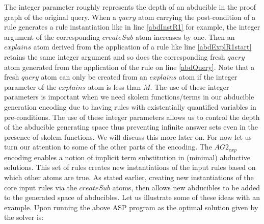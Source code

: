 The integer parameter roughly
represents the depth of an abducible in the proof graph of the original
query. When a $query$ atom carrying the post-condition of a rule generates a
rule instantiation like in line \ref{abdInstR1} for example, the integer argument of the
corresponding $createSub$ atom increases by one. Then an $explains$ atom
derived from the application of a rule like line \ref{abdExplR1start} retains the same integer
argument and so does the corresponding fresh $query$ atom generated from the
application of the rule on line \ref{abdQuery}. Note that a fresh $query$ atom can only be
created from an $explains$ atom if the integer parameter of the $explains$
atom is less than $M$. The use of these integer parameters is important
when we need skolem functions/terms in our abducible generation encoding due
to having rules with existentially quantified variables in pre-conditions. The
use of these integer parameters allows us to control the depth of the
abducible generating space thus preventing infinite answer sets even in the
presence of skolem functions. We will discuss this more later on. For now let
us turn our attention to some of the other parts of the encoding. The
$AG2_{exp}$ encoding enables a notion of implicit term substitution
in (minimal) abductive solutions. This set of rules creates new instantiations
of the input rules based on which other atoms are true. As stated earlier, creating new instantiations of the core input rules via the $createSub$ atoms, then allows
new abducibles to be added to the generated space of abducibles. Let us
illustrate some of these ideas with an example. Upon running the above ASP
program as the optimal solution given by the solver is: 

